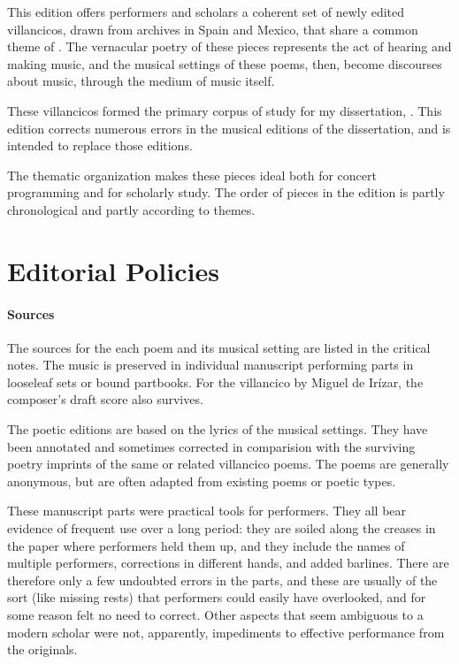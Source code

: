 This edition offers performers and scholars a coherent set of newly edited villancicos, drawn from archives in Spain and Mexico, that share a common theme of .
The vernacular poetry of these pieces represents the act of hearing and making music, and the musical settings of these poems, then, become discourses about music, through the medium of music itself.%
  \begin{Footnote}
  These villancicos formed the primary corpus of study for my dissertation, \citemydiss.
  This edition corrects numerous errors in the musical editions of the dissertation, and is intended to replace those editions.
  \end{Footnote}
The thematic organization makes these pieces ideal both for concert programming and for scholarly study.
The order of pieces in the edition is partly chronological and partly according to themes.


\section{Editorial Policies}

\paragraph{Sources}

The sources for the each poem and its musical setting are listed in the critical notes.
The music is preserved in individual manuscript performing parts in looseleaf sets or bound partbooks.
For the villancico by Miguel de Irízar, the composer's draft score also survives.

The poetic editions are based on the lyrics of the musical settings.
They have been annotated and sometimes corrected in comparision with the surviving poetry imprints of the same or related villancico poems.
The poems are generally anonymous, but are often adapted from existing poems or poetic types.

These manuscript parts were practical tools for performers.
They all bear evidence of frequent use over a long period: they are soiled along the creases in the paper where performers held them up, and they include the names of multiple performers, corrections in different hands, and added barlines.
There are therefore only a few undoubted errors in the parts, and these are usually of the sort (like missing rests) that performers could easily have overlooked, and for some reason felt no need to correct.
Other aspects that seem ambiguous to a modern scholar were not, apparently, impediments to effective performance from the originals.


